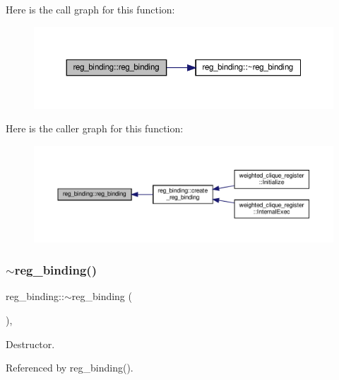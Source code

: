 Here is the call graph for this function\+:
\nopagebreak
\begin{figure}[H]
\begin{center}
\leavevmode
\includegraphics[width=350pt]{da/d7c/classreg__binding_ae694dc53d5c425815130c00a5fdef84e_cgraph}
\end{center}
\end{figure}
Here is the caller graph for this function\+:
\nopagebreak
\begin{figure}[H]
\begin{center}
\leavevmode
\includegraphics[width=350pt]{da/d7c/classreg__binding_ae694dc53d5c425815130c00a5fdef84e_icgraph}
\end{center}
\end{figure}
\mbox{\label{classreg__binding_a4e041c68851cd271288ca373ab2f7e31}} 
\subsubsection{\texorpdfstring{$\sim$reg\+\_\+binding()}{~reg\_binding()}}
{\footnotesize\ttfamily reg\+\_\+binding\+::$\sim$reg\+\_\+binding (\begin{DoxyParamCaption}{ }\end{DoxyParamCaption})\hspace{0.3cm}{\ttfamily [virtual]}, {\ttfamily [default]}}



Destructor. 



Referenced by reg\+\_\+binding().

